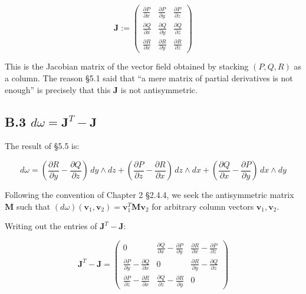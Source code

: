 \[\mathbf{J} := \begin{pmatrix}
\frac{\partial P}{\partial x} & \frac{\partial P}{\partial y} & \frac{\partial P}{\partial z} \\
\frac{\partial Q}{\partial x} & \frac{\partial Q}{\partial y} & \frac{\partial Q}{\partial z} \\
\frac{\partial R}{\partial x} & \frac{\partial R}{\partial y} & \frac{\partial R}{\partial z}
\end{pmatrix}\]

This is the Jacobian matrix of the vector field obtained by stacking
\((P,Q,R)\) as a column. The reason §5.1 said that ``a mere matrix of
partial derivatives is not enough'' is precisely that this
\(\mathbf{J}\) is not antisymmetric.

\hypertarget{b.3-domega-mathbfjt---mathbfj}{%
\subsection{\texorpdfstring{B.3
\(d\omega = \mathbf{J}^T - \mathbf{J}\)}{B.3 d\textbackslash omega = \textbackslash mathbf\{J\}\^{}T - \textbackslash mathbf\{J\}}}\label{b.3-domega-mathbfjt---mathbfj}}

The result of §5.5 is:

\[d\omega = (\frac{\partial R}{\partial y} - \frac{\partial Q}{\partial z})\,dy \wedge dz + (\frac{\partial P}{\partial z} - \frac{\partial R}{\partial x})\,dz \wedge dx + (\frac{\partial Q}{\partial x} - \frac{\partial P}{\partial y})\,dx \wedge dy\]

Following the convention of Chapter 2 §2.4.4, we seek the antisymmetric
matrix \(\mathbf{M}\) such that
\((d\omega)(\mathbf{v}_1, \mathbf{v}_2) = \mathbf{v}_1^T \mathbf{M} \mathbf{v}_2\)
for arbitrary column vectors \(\mathbf{v}_1, \mathbf{v}_2\).

Writing out the entries of \(\mathbf{J}^T - \mathbf{J}\):

\[\mathbf{J}^T - \mathbf{J} = \begin{pmatrix}
0 & \frac{\partial Q}{\partial x} - \frac{\partial P}{\partial y} & \frac{\partial R}{\partial x} - \frac{\partial P}{\partial z} \\
\frac{\partial P}{\partial y} - \frac{\partial Q}{\partial x} & 0 & \frac{\partial R}{\partial y} - \frac{\partial Q}{\partial z} \\
\frac{\partial P}{\partial z} - \frac{\partial R}{\partial x} & \frac{\partial Q}{\partial z} - \frac{\partial R}{\partial y} & 0
\end{pmatrix}\]

